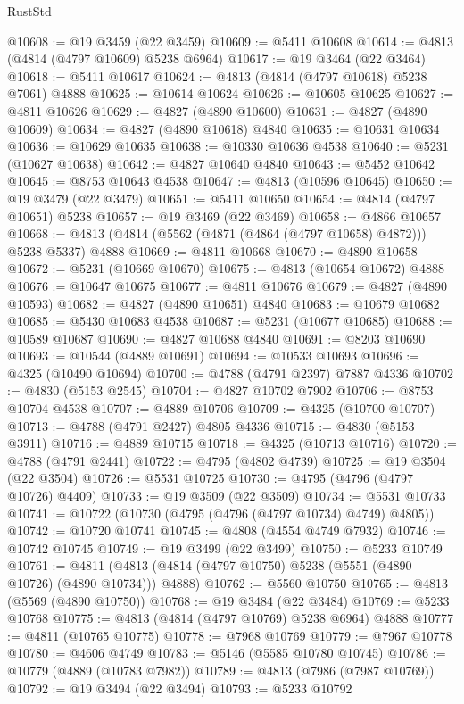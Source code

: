 \begin{lexlean}{RustStd}
\begin{coremodule}
@10608 := @19 @3459 (@22 @3459)
@10609 := @5411 @10608
@10614 := @4813 (@4814 (@4797 @10609) @5238 @6964)
@10617 := @19 @3464 (@22 @3464)
@10618 := @5411 @10617
@10624 := @4813 (@4814 (@4797 @10618) @5238 @7061) @4888
@10625 := @10614 @10624
@10626 := @10605 @10625
@10627 := @4811 @10626
@10629 := @4827 (@4890 @10600)
@10631 := @4827 (@4890 @10609)
@10634 := @4827 (@4890 @10618) @4840
@10635 := @10631 @10634
@10636 := @10629 @10635
@10638 := @10330 @10636 @4538
@10640 := @5231 (@10627 @10638)
@10642 := @4827 @10640 @4840
@10643 := @5452 @10642
@10645 := @8753 @10643 @4538
@10647 := @4813 (@10596 @10645)
@10650 := @19 @3479 (@22 @3479)
@10651 := @5411 @10650
@10654 := @4814 (@4797 @10651) @5238
@10657 := @19 @3469 (@22 @3469)
@10658 := @4866 @10657
@10668 := @4813 (@4814 (@5562 (@4871 (@4864 (@4797 @10658) @4872))) @5238 @5337) @4888
@10669 := @4811 @10668
@10670 := @4890 @10658
@10672 := @5231 (@10669 @10670)
@10675 := @4813 (@10654 @10672) @4888
@10676 := @10647 @10675
@10677 := @4811 @10676
@10679 := @4827 (@4890 @10593)
@10682 := @4827 (@4890 @10651) @4840
@10683 := @10679 @10682
@10685 := @5430 @10683 @4538
@10687 := @5231 (@10677 @10685)
@10688 := @10589 @10687
@10690 := @4827 @10688 @4840
@10691 := @8203 @10690
@10693 := @10544 (@4889 @10691)
@10694 := @10533 @10693
@10696 := @4325 (@10490 @10694)
@10700 := @4788 (@4791 @2397) @7887 @4336
@10702 := @4830 (@5153 @2545)
@10704 := @4827 @10702 @7902
@10706 := @8753 @10704 @4538
@10707 := @4889 @10706
@10709 := @4325 (@10700 @10707)
@10713 := @4788 (@4791 @2427) @4805 @4336
@10715 := @4830 (@5153 @3911)
@10716 := @4889 @10715
@10718 := @4325 (@10713 @10716)
@10720 := @4788 (@4791 @2441)
@10722 := @4795 (@4802 @4739)
@10725 := @19 @3504 (@22 @3504)
@10726 := @5531 @10725
@10730 := @4795 (@4796 (@4797 @10726) @4409)
@10733 := @19 @3509 (@22 @3509)
@10734 := @5531 @10733
@10741 := @10722 (@10730 (@4795 (@4796 (@4797 @10734) @4749) @4805))
@10742 := @10720 @10741
@10745 := @4808 (@4554 @4749 @7932)
@10746 := @10742 @10745
@10749 := @19 @3499 (@22 @3499)
@10750 := @5233 @10749
@10761 := @4811 (@4813 (@4814 (@4797 @10750) @5238 (@5551 (@4890 @10726) (@4890 @10734))) @4888)
@10762 := @5560 @10750
@10765 := @4813 (@5569 (@4890 @10750))
@10768 := @19 @3484 (@22 @3484)
@10769 := @5233 @10768
@10775 := @4813 (@4814 (@4797 @10769) @5238 @6964) @4888
@10777 := @4811 (@10765 @10775)
@10778 := @7968 @10769
@10779 := @7967 @10778
@10780 := @4606 @4749
@10783 := @5146 (@5585 @10780 @10745)
@10786 := @10779 (@4889 (@10783 @7982))
@10789 := @4813 (@7986 (@7987 @10769))
@10792 := @19 @3494 (@22 @3494)
@10793 := @5233 @10792

\end{coremodule}
\end{lexlean}
